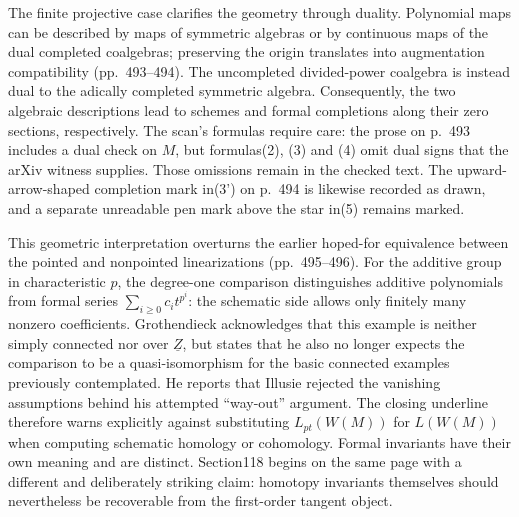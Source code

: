 The finite projective case clarifies the geometry through duality. Polynomial maps can be described by maps of symmetric algebras or by continuous maps of the dual completed coalgebras; preserving the origin translates into augmentation compatibility (pp.~493--494). The uncompleted divided-power coalgebra is instead dual to the adically completed symmetric algebra. Consequently, the two algebraic descriptions lead to schemes and formal completions along their zero sections, respectively. The scan's formulas require care: the prose on p.~493 includes a dual check on $M$, but formulas(2), (3) and (4) omit dual signs that the arXiv witness supplies. Those omissions remain in the checked text. The upward-arrow-shaped completion mark in(3') on p.~494 is likewise recorded as drawn, and a separate unreadable pen mark above the star in(5) remains marked.

This geometric interpretation overturns the earlier hoped-for equivalence between the pointed and nonpointed linearizations (pp.~495--496). For the additive group in characteristic $p$, the degree-one comparison distinguishes additive polynomials from formal series $\sum_{i\geq0}c_i t^{p^i}$: the schematic side allows only finitely many nonzero coefficients. Grothendieck acknowledges that this example is neither simply connected nor over $\underline Z$, but states that he also no longer expects the comparison to be a quasi-isomorphism for the basic connected examples previously contemplated. He reports that Illusie rejected the vanishing assumptions behind his attempted ``way-out'' argument. The closing underline therefore warns explicitly against substituting $L_{pt}(W(M))$ for $L(W(M))$ when computing schematic homology or cohomology. Formal invariants have their own meaning and are distinct. Section118 begins on the same page with a different and deliberately striking claim: homotopy invariants themselves should nevertheless be recoverable from the first-order tangent object.

